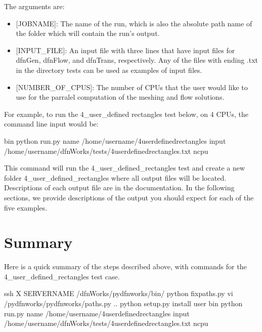 \documentclass[letterpaper,10pt,english]{sphinxmanual}
\begin{document}
The arguments are:
\begin{itemize}
\item {} 
{[}JOBNAME{]}: The name of the run, which is also the absolute path name of the folder which will contain the run’s output.

\item {} 
{[}INPUT\_FILE{]}: An input file with three lines that have input files for dfnGen, dfnFlow, and dfnTrans, respectively. Any of the files with ending .txt in the directory tests can be used as examples of input files.

\item {} 
{[}NUMBER\_OF\_CPUS{]}: The number of CPUs that the user would like to use for the parralel computation of the meshing and flow solutions.

\end{itemize}

For example, to run the 4\_user\_defined rectangles test below, on 4 CPUs,  the command line input would be:

%
\begin{sphinxVerbatim}[commandchars=\\\{\}]
\PYGZdl{}  bin
\PYGZdl{} python run.py \PYGZhy{}name /home/username/4\PYGZus{}user\PYGZus{}defined\PYGZus{}rectangles
 \PYGZhy{}input /home/username/dfnWorks/tests/4\PYGZus{}user\PYGZus{}defined\PYGZus{}rectangles.txt
 \PYGZhy{}ncpu 
\end{sphinxVerbatim}

This command will run the 4\_user\_defined\_rectangles test and create a new folder 4\_user\_defined\_rectangles where all output files will be located. Descriptions of each output file are in the documentation. In the following sections, we provide descriptions of the output you should expect for each of the five examples.


\section{Summary}
\label{\detokenize{tutorial:summary}}
Here is a quick summary of the steps described above, with commands for the 4\_user\_defined\_rectangles test case. 

%
\begin{sphinxVerbatim}[commandchars=\\\{\}]
\PYGZdl{} ssh \PYGZhy{}X SERVER\PYGZus{}NAME
\PYGZdl{}  \PYGZti{}/dfnWorks/pydfnworks/bin/
\PYGZdl{} python fix\PYGZus{}paths.py
\PYGZdl{} vi /pydfnworks/pydfnworks/paths.py
\PYGZdl{}  ..
\PYGZdl{} python setup.py install \PYGZhy{}\PYGZhy{}user
\PYGZdl{}  bin
\PYGZdl{} python run.py \PYGZhy{}name /home/username/4\PYGZus{}user\PYGZus{}defined\PYGZus{}rectangles
 \PYGZhy{}input /home/username/dfnWorks/tests/4\PYGZus{}user\PYGZus{}defined\PYGZus{}rectangles.txt
 \PYGZhy{}ncpu 
\end{sphinxVerbatim}
\end{document}
